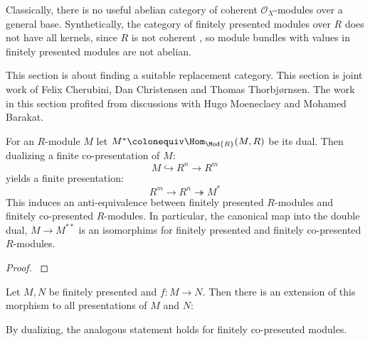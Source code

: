 
Classically, there is no useful abelian category of coherent $\mathcal O_X$-modules over a general base.
Synthetically, the category of finitely presented modules over $R$ does not have all kernels,
since $R$ is not coherent \cite[3.2]{topology-draft}, so module bundles with values in finitely presented modules are not abelian.

This section is about finding a suitable replacement category.
This section is joint work of Felix Cherubini, Dan Christensen and Thomas Thorbjørnsen.
The work in this section profited from discussions with Hugo Moeneclaey and Mohamed Barakat.

\begin{theorem}
  For an $R$-module $M$ let $M^\ast\colonequiv \Hom_{\Mod{R}}(M,R)$ be its dual.
  Then dualizing a finite co-presentation of $M$:
  \[ M \hookrightarrow R^n \to R^m \]
  yields a finite presentation:
  \[ R^m \to R^n \twoheadrightarrow M^\ast \]
  This induces an anti-equivalence between finitely presented $R$-modules and finitely co-presented $R$-modules. In particular, the canonical map into the double dual, $M\to M^{\ast\ast}$ is an isomorphims for finitely presented and finitely co-presented $R$-modules.
\end{theorem}

\begin{proof}
  \cite{diffgeo-article}
\end{proof}


\begin{lemma}
  \label{presentation-extension}
  Let $M,N$ be finitely presented and $f:M\to N$.
  Then there is an extension of this morphism to all presentations of $M$ and $N$:
  \begin{center}
  \end{center}
  By dualizing, the analogous statement holds for finitely co-presented modules.
\end{lemma}

